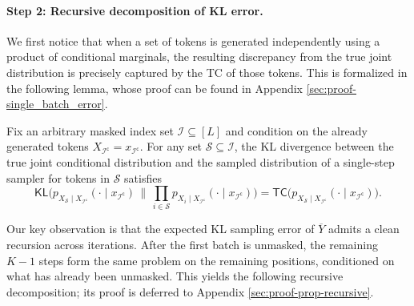 \documentclass[english]{article}
\newcommand{\cS}{\mathcal{S}}
\newcommand{\cI}{\mathcal{I}}
\newcommand{\KL}{\mathsf{KL}}
\newcommand{\TC}{\mathsf{TC}}
\begin{document}
\paragraph{Step 2: Recursive decomposition of KL error.}



We first notice that when a set of tokens is generated independently using a product of conditional marginals, the resulting discrepancy from the true joint distribution is precisely captured by the TC of those tokens. 
This is formalized in the following lemma, whose proof can be found in Appendix \ref{sec:proof-single_batch_error}.
\begin{lemma}
\label{lem:single_batch_error}
Fix an arbitrary masked index set $\cI \subseteq [L]$ and condition on the already generated tokens $X_{\cI^\mathsf{c}} =x_{\cI^\mathsf{c}}$. For any set $\cS \subseteq \cI$, the KL divergence between the true joint conditional distribution and the sampled distribution of a single-step sampler for tokens in $\cS$ satisfies
\[
    \KL\Big(p_{X_\cS \mid X_{\cI^\mathsf{c}}}(\cdot \mid x_{\cI^\mathsf{c}}) \,\big\|\, \prod_{i \in \cS} p_{X_i \mid X_{\cI^\mathsf{c}}}(\cdot \mid x_{\cI^\mathsf{c}}) \Big) = \TC \big(p_{X_\cS \mid X_{\cI^\mathsf{c}}}(\cdot \mid x_{\cI^\mathsf{c}}) \big).
\]
\end{lemma}





Our key observation is that the expected KL sampling error of $\overline Y$ admits a clean recursion across iterations. After the first batch is unmasked, the remaining $K-1$ steps form the same problem on the remaining positions, conditioned on what has already been unmasked.
This yields the following recursive decomposition; its proof is deferred to Appendix \ref{sec:proof-prop-recursive}.
\end{document}
